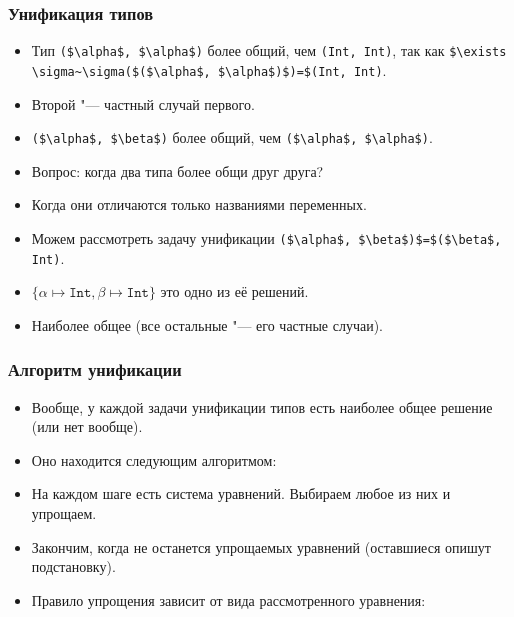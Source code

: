 \documentclass[11pt]{beamer}
\begin{document}
\begin{frame}[fragile]
  \frametitle{Унификация типов}
  \begin{itemize}
    \item Тип \lstinline[mathescape]|($\alpha$, $\alpha$)| более общий, чем \lstinline[mathescape]|(Int, Int)|, так как  \lstinline[mathescape]|$\exists \sigma~\sigma($($\alpha$, $\alpha$)$)=$(Int, Int)|.
    \item Второй "--- частный случай первого.
          \pause
    \item \lstinline[mathescape]|($\alpha$, $\beta$)| более общий, чем \lstinline[mathescape]|($\alpha$, $\alpha$)|.
          \pause
    \item Вопрос: когда два типа более общи друг друга?
          \pause
    \item Когда они отличаются только названиями переменных.
          \pause
    \item Можем рассмотреть задачу унификации \lstinline[mathescape]|($\alpha$, $\beta$)$=$($\beta$, Int)|.
          \pause
    \item $\{ \alpha \mapsto \mathtt{Int}, \beta \mapsto \mathtt{Int} \}$ это одно из её решений.
          \pause
    \item Наиболее общее (все остальные "--- его частные случаи).
  \end{itemize}
\end{frame}

\begin{frame}[fragile]
  \frametitle{Алгоритм унификации}
  \begin{itemize}
    \item Вообще, у каждой задачи унификации типов есть наиболее общее решение (или нет вообще).
    \item Оно находится следующим алгоритмом:
          \pause
    \item На каждом шаге есть система уравнений. Выбираем любое из них и упрощаем.
    \item Закончим, когда не останется упрощаемых уравнений (оставшиеся опишут подстановку).
    \item Правило упрощения зависит от вида рассмотренного уравнения:
  \end{itemize}
\end{frame}
\end{document}
